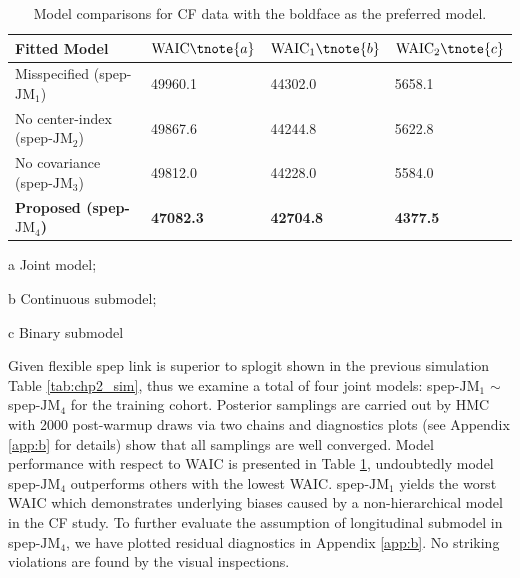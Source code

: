 \begin{center}
\begin{table}[H]
 \caption{Model comparisons for CF data with the boldface as the preferred model.} \label{tab:chp2_app_waic}
 \centering
   \begin{threeparttable}
  \begin{tabular}{m{}m{}m{}m{}}
    \toprule
 Fitted Model & $\mbox{WAIC} \tnote{a} $ & $\mbox{WAIC}_1 \tnote{b} $ & $\mbox{WAIC}_2 \tnote{c} $ \\
 \midrule 
   Misspecified (spep-$\mbox{JM}_1$) & 49960.1 &	44302.0	& 5658.1\\
    No center-index (spep-$\mbox{JM}_2$) & 49867.6 &	44244.8	& 5622.8\\
    No covariance (spep-$\mbox{JM}_3$)  & 49812.0 & 44228.0 & 5584.0\\
   \bf Proposed (spep-$\mbox{JM}_4$) & \bf 47082.3 & \bf 42704.8 & \bf 4377.5\\
    \bottomrule
  \end{tabular}
   \begin{tablenotes}[para]
    \footnotesize
        \item[a] Joint model; \item[b] Continuous submodel; \item[c] Binary submodel
    \end{tablenotes}
     \end{threeparttable}
\end {table}
\end{center}

Given flexible spep link is superior to splogit shown in the previous simulation Table \ref{tab:chp2_sim}, thus we examine a total of four joint models: spep-$\mbox{JM}_1$ $\sim$ spep-$\mbox{JM}_4$ for the training cohort. Posterior samplings are carried out by HMC with 2000 post-warmup draws via two chains and diagnostics plots (see Appendix \ref{app:b} for details) show that all samplings are well converged. Model performance with respect to WAIC is presented in Table \ref{tab:chp2_app_waic}, undoubtedly model spep-$\mbox{JM}_4$ outperforms others with the lowest WAIC. spep-$\mbox{JM}_1$ yields the worst WAIC which demonstrates underlying biases caused by a non-hierarchical model in the CF study. To further evaluate the assumption of longitudinal submodel in spep-$\mbox{JM}_4$, we have plotted residual diagnostics in Appendix \ref{app:b}. No striking violations are found by the visual inspections. 

